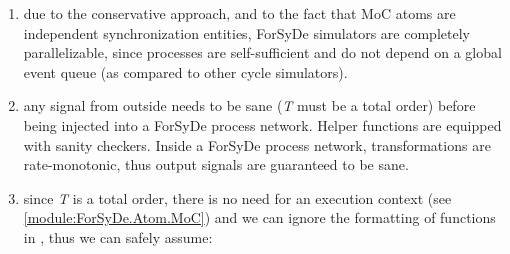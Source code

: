 \begin{enumerate}
                 \item 
                 due to the conservative approach, and to the fact that MoC
 atoms are independent synchronization entities, ForSyDe
 simulators are completely parallelizable, since processes are
 self-sufficient and do not depend on a global event queue (as
 compared to other cycle simulators).\par
                 
                 \item 
                 any signal from outside needs to be sane (\emph{T} must be a total
 order) before being injected into a ForSyDe process
 network. Helper functions are equipped with sanity
 checkers. Inside a ForSyDe process network, transformations are
 rate-monotonic, thus output signals are guaranteed to be sane.\par
                 
                 \item 
                 since \emph{T} is a total order, there is no need for an
 execution context (see \cref{module:ForSyDe.Atom.MoC}) and we can
 ignore the formatting of functions in , thus we
 can safely assume:\par
                 
                 \end{enumerate}
                 \par
                 
